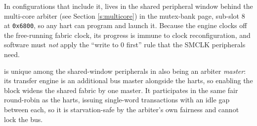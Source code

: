 In configurations that include it,  lives in the shared peripheral window behind the multi-core arbiter (see Section \ref{s:multicore}) in the mutex-bank page, sub-slot 8 at \texttt{0x6800}, so any hart can program and launch it. Because the engine clocks off the free-running fabric clock, its progress is immune to clock reconfiguration, and software must \emph{not} apply the ``write  to 0 first'' rule that the SMCLK peripherals need.

 is unique among the shared-window peripherals in also being an arbiter \emph{master}: its transfer engine is an additional bus master alongside the harts, so enabling the block widens the shared fabric by one master. It participates in the same fair round-robin as the harts, issuing single-word transactions with an idle gap between each, so it is starvation-safe by the arbiter's own fairness and cannot lock the bus.
